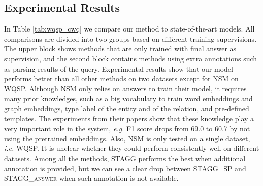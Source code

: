 \subsection{Experimental Results}



 In Table \ref{tab:wqsp_cwq} we compare our method to state-of-the-art models. All comparisons are divided into two groups based on different training supervisions. The upper block shows methods that are only trained with final answer as supervision, and the second block contains methods using extra annotations such as parsing results of the query. Experimental results show that our model performs better than all other methods on two datasets except for NSM \cite{DBLP:conf/acl/LiangBLFL17} on WQSP. Although NSM only relies on answers to train their model, it requires many prior knowledges, such as a big vocabulary to train word embeddings and graph embeddings, type label of the entity and of the relation, and pre-defined templates. The experiments from their papers show that these knowledge play a very important role in the system, \emph{e.g.} F1 score drops from 69.0 to 60.7 by not using the pretrained embeddings. %
 Also, NSM is only tested on a single dataset, \emph{i.e.} WQSP. It is unclear whether they could perform consistently well on different datasets. Among all the methods, \textsc{STAGG} performs the best when additional annotation is provided, but we can see a clear drop between \textsc{STAGG\_SP} and \textsc{STAGG\_answer} when such annotation is not available.



